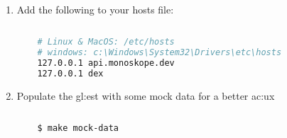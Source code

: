 \begin{enumerate}
  \item Add the following to your hosts file:

  \begin{lstlisting}[language=bash, caption={Update hosts file}, label={sh:uhf}]
    
    # Linux & MacOS: /etc/hosts
    # windows: c:\Windows\System32\Drivers\etc\hosts
    127.0.0.1 api.monoskope.dev
    127.0.0.1 dex
  \end{lstlisting}

  \item Populate the \gls{gl:est} with some mock data for a better \gls{ac:ux}

  \begin{lstlisting}[language=bash, caption={Populate the \gls{gl:est} with some mock}, label={sh:pemd}]
    
    $ make mock-data
  \end{lstlisting}
\end{enumerate}
